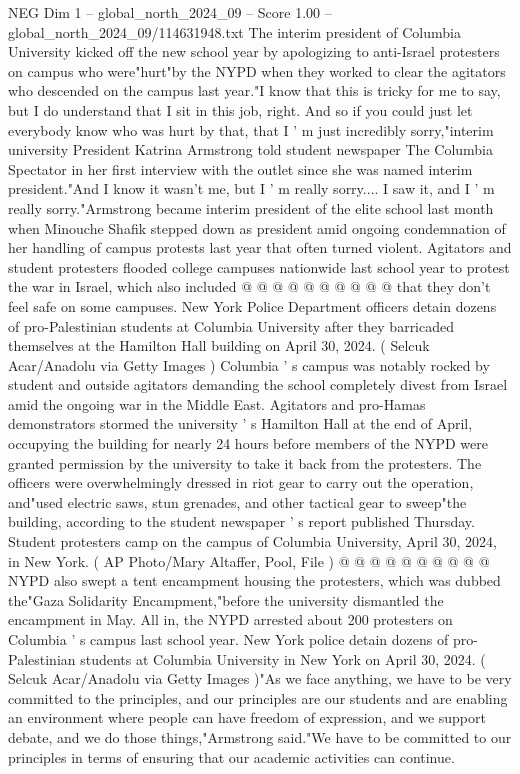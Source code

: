 \begin{textsample}{NEG Dim 1 – global\_north\_2024\_09 – Score 1.00 – global\_north\_2024\_09/114631948.txt}  \label{ex:f1_neg_366}
The interim president of Columbia University kicked off the new school year by apologizing to anti-Israel protesters on campus who were"hurt"by the NYPD when they worked to clear the agitators who descended on the campus last year."I know that this is tricky for me to say, but I do understand that I sit in this job, right.
And so if you could just let everybody know who was hurt by that, that I ' m just incredibly sorry,"interim university President Katrina Armstrong told student newspaper The Columbia Spectator in her first interview with the outlet since she was named interim president."And I know it wasn't me, but I ' m really sorry....
I saw it, and I ' m really sorry."Armstrong became interim president of the elite school last month when Minouche Shafik stepped down as president amid ongoing condemnation of her handling of campus protests last year that often turned violent.
Agitators and student protesters flooded college campuses nationwide last school year to protest the war in Israel, which also included @ @ @ @ @ @ @ @ @ @ that they don't feel safe on some campuses.
New York Police Department officers detain dozens of pro-Palestinian students at Columbia University after they barricaded themselves at the Hamilton Hall building on April 30, 2024. ( Selcuk Acar/Anadolu via Getty Images ) Columbia ' s campus was notably rocked by student and outside agitators demanding the school completely divest from Israel amid the ongoing war in the Middle East.
Agitators and pro-Hamas demonstrators stormed the university ' s Hamilton Hall at the end of April, occupying the building for nearly 24 hours before members of the NYPD were granted permission by the university to take it back from the protesters.
The officers were overwhelmingly dressed in riot gear to carry out the operation, and"used electric saws, stun grenades, and other tactical gear to sweep"the building, according to the student newspaper ' s report published Thursday.
Student protesters camp on the campus of Columbia University, April 30, 2024, in New York. ( AP Photo/Mary Altaffer, Pool, File ) @ @ @ @ @ @ @ @ @ @ NYPD also swept a tent encampment housing the protesters, which was dubbed the"Gaza Solidarity Encampment,"before the university dismantled the encampment in May.
All in, the NYPD arrested about 200 protesters on Columbia ' s campus last school year.
New York police detain dozens of pro-Palestinian students at Columbia University in New York on April 30, 2024. ( Selcuk Acar/Anadolu via Getty Images )"As we face anything, we have to be very committed to the principles, and our principles are our students and are enabling an environment where people can have freedom of expression, and we support debate, and we do those things,"Armstrong said."We have to be committed to our principles in terms of ensuring that our academic activities can continue.

\end{textsample}
